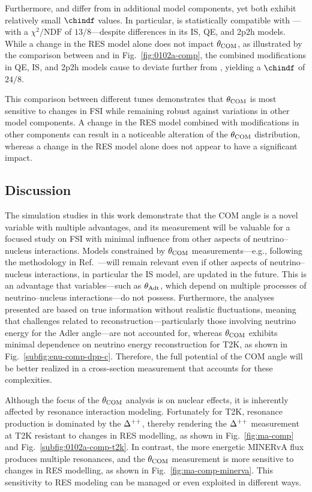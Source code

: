      Furthermore, \geoa and \getwoa differ from \gZero in additional model components, yet both exhibit relatively small $\chindf$ values.
     In particular, \getwoa is statistically compatible with \gZero—with a $\chi^2/\textrm{NDF}$ of $13/8$—despite differences in its IS, QE, and 2p2h models.
     While a change in the RES model alone does not impact $\theta_{\textrm{COM}}$, as illustrated by the comparison between \geoa and \getwoa in Fig.~\ref{fig:0102a-comp}, the combined modifications in QE, IS, and 2p2h models cause \geoa to deviate further from \gZero, yielding a $\chindf$ of $24/8$.

     This comparison between different \genie tunes demonstrates that $\theta_{\textrm{COM}}$ is most sensitive to changes in FSI while remaining robust against variations in other model components.
     A change in the RES model combined with modifications in other components can result in a noticeable alteration of the $\theta_{\textrm{COM}}$ distribution, whereas a change in the RES model alone does not appear to have a significant impact.


     \subsection{Discussion}
     \label{sec:dis}
     The simulation studies in this work demonstrate that the COM angle is a novel variable with multiple advantages, and its measurement will be valuable for a focused study on FSI with minimal influence from other aspects of neutrino–nucleus interactions.
     Models constrained by $\theta_{\textrm{COM}}$ measurements—e.g., following the methodology in Ref.~\cite{GENIE:2021zuu}—will remain relevant even if other aspects of neutrino–nucleus interactions, in particular the IS model, are updated in the future.
     This is an advantage that variables—such as $\theta_{\textrm{Adt}}$, which depend on multiple processes of neutrino–nucleus interactions—do not possess.
     Furthermore, the analyses presented are based on true information without realistic fluctuations, meaning that challenges related to reconstruction—particularly those involving neutrino energy for the Adler angle—are not accounted for, whereas $\theta_{\textrm{COM}}$ exhibits minimal dependence on neutrino energy reconstruction for T2K, as shown in Fig.~\ref{subfig:enu-comp-dpp-c}.
     Therefore, the full potential of the COM angle will be better realized in a cross-section measurement that accounts for these complexities.

     Although the focus of the $\theta_{\textrm{COM}}$ analysis is on nuclear effects, it is inherently affected by resonance interaction modeling.
     Fortunately for T2K, resonance production is dominated by the $\Delta^{++}$, thereby rendering the $\Delta^{++}$ measurement at T2K resistant to changes in RES modelling, as shown in Fig.~\ref{fig:ma-comp} and Fig.~\ref{subfig:0102a-comp-t2k}.
     In contrast, the more energetic MINERvA flux produces multiple resonances, and the $\theta_{\textrm{COM}}$ measurement is more sensitive to changes in RES modelling, as shown in Fig.~\ref{fig:ma-comp-minerva}.
     This sensitivity to RES modeling can be managed or even exploited in different ways.

